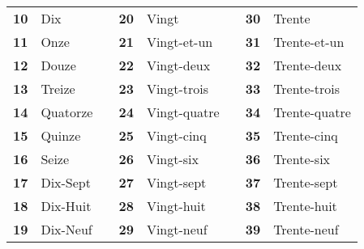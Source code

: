 \documentclass{article}
\begin{document}
            \begin{center}
                \begin{tabular}{r  l  c  r  l  c  r  l}
                    \textbf{10} & Dix      &   & \textbf{20} & Vingt        &   & \textbf{30} & Trente\\
                    \textbf{11} & Onze     &   & \textbf{21} & Vingt-et-un  &   & \textbf{31} & Trente-et-un\\
                    \textbf{12} & Douze    &   & \textbf{22} & Vingt-deux   &   & \textbf{32} & Trente-deux\\
                    \textbf{13} & Treize   &   & \textbf{23} & Vingt-trois  &   & \textbf{33} & Trente-trois\\
                    \textbf{14} & Quatorze &   & \textbf{24} & Vingt-quatre &   & \textbf{34} & Trente-quatre\\
                    \textbf{15} & Quinze   &   & \textbf{25} & Vingt-cinq   &   & \textbf{35} & Trente-cinq\\
                    \textbf{16} & Seize    &   & \textbf{26} & Vingt-six    &   & \textbf{36} & Trente-six \\
                    \textbf{17} & Dix-Sept &   & \textbf{27} & Vingt-sept   &   & \textbf{37} & Trente-sept\\
                    \textbf{18} & Dix-Huit &   & \textbf{28} & Vingt-huit   &   & \textbf{38} & Trente-huit\\
                    \textbf{19} & Dix-Neuf &   & \textbf{29} & Vingt-neuf   &   & \textbf{39} & Trente-neuf\\ [2.5ex]
                

\end{tabular}
\end{center}
\end{document}
